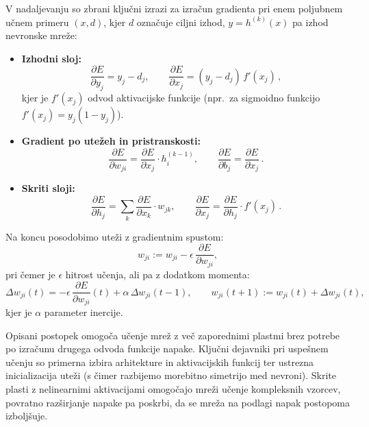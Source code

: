 V nadaljevanju so zbrani ključni izrazi za izračun gradienta pri enem poljubnem učnem primeru $(x, d)$, kjer $d$ označuje ciljni izhod, $y = h^{(k)}(x)$ pa izhod nevronske mreže:
\begin{itemize}
  \item \textbf{Izhodni sloj:}
  \[
    \frac{\partial E}{\partial y_j} = y_j - d_j,\qquad 
    \frac{\partial E}{\partial x_j} = (y_j - d_j)\, f'(x_j)\,,
  \]
  kjer je $f'(x_j)$ odvod aktivacijske funkcije (npr.\ za sigmoidno funkcijo $f'(x_j) = y_j (1 - y_j)$).
  \item \textbf{Gradient po utežeh in pristranskosti:}
  \[
    \frac{\partial E}{\partial w_{ji}} = \frac{\partial E}{\partial x_j} \cdot h^{(k-1)}_i,\qquad 
    \frac{\partial E}{\partial b_j} = \frac{\partial E}{\partial x_j}\,. 
  \]
  \item \textbf{Skriti sloji:}
  \[
    \frac{\partial E}{\partial h_j} = \sum_{k} \frac{\partial E}{\partial x_k} \cdot w_{jk},\qquad 
    \frac{\partial E}{\partial x_j} = \frac{\partial E}{\partial h_j} \cdot f'(x_j)\,. 
  \]
\end{itemize}

Na koncu posodobimo uteži z gradientnim spustom:
\[
  w_{ji} := w_{ji} - \epsilon \, \frac{\partial E}{\partial w_{ji}}\!,
\] 
pri čemer je $\epsilon$ hitrost učenja, ali pa z dodatkom momenta:
\[
  \Delta w_{ji}(t) = -\epsilon \, \frac{\partial E}{\partial w_{ji}}(t) + \alpha\, \Delta w_{ji}(t-1),\qquad 
  w_{ji}(t+1) := w_{ji}(t) + \Delta w_{ji}(t)\!,
\] 
kjer je $\alpha$ parameter inercije.

Opisani postopek omogoča učenje mrež z več zaporednimi plastmi brez potrebe po izračunu drugega odvoda funkcije napake. Ključni dejavniki pri uspešnem učenju so primerna izbira arhitekture in aktivacijskih funkcij ter ustrezna inicializacija uteži (s čimer razbijemo morebitno simetrijo med nevroni). Skrite plasti z nelinearnimi aktivacijami omogočajo mreži učenje kompleksnih vzorcev, povratno razširjanje napake pa poskrbi, da se mreža na podlagi napak postopoma izboljšuje.
